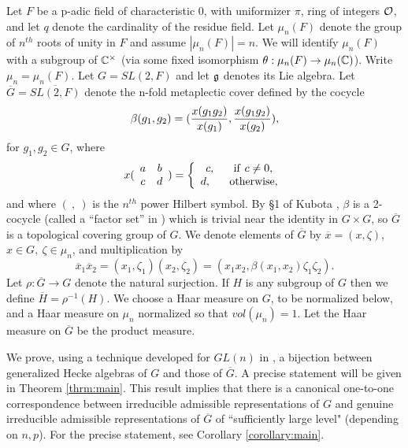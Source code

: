 
Let $F$ be a p-adic field of characteristic 0, 
with uniformizer $\pi$, ring of integers ${\cal O}$, and let 
$q$ denote the cardinality of the residue field.
Let $\mu_n(F)$ denote the group of $n^{th}$ roots of unity
in $F$ and assume $|\mu_n(F)|=n$. We 
will identify $\mu_n(F)$ with a subgroup 
of ${\Bbb{C}}^\times$
(via some fixed isomorphism 
$\theta:\mu_n(F)\rightarrow \mu_n({\Bbb{C}})$).
Write $\mu_n=\mu_n(F)$.
Let $G=SL(2,F)$ and let $\frak{g}$ denotes its Lie algebra.
Let $\overline{G}=\overline{SL(2,F)}$ denote the n-fold metaplectic
cover defined by the cocycle
\[
\beta(g_1,g_2)=({x(g_1g_2)\over x(g_1)},{x(g_1g_2)\over x(g_2)}),
\]
for $g_1,g_2\in G$, where
\[
x(
\begin{array}{cc}
a & b\\
c & d
\end{array}
)=
\left\{
\begin{array}{c}
c,\ \ \ \ \ {\rm if}\ c\not= 0,\\
d,\ \ \ \ \ {\rm otherwise},
\end{array}
\right.
\]
and where $(\ ,\ )$ is the $n^{th}$ power Hilbert symbol. 
By \S 1 of Kubota \cite{K}, $\beta$ is a 2-cocycle 
(called a ``factor set'' in \cite{K}) which is trivial
near the identity in $G\times G$, so $\overline{G}$ is a 
topological covering group of $G$. We denote
elements of $\overline{G}$ by $\overline{x}=(x,\zeta)$,
$x\in G,\ \zeta\in \mu_n$, and multiplication by
\[
\overline{x}_1\overline{x}_2=(x_1,\zeta_1)(x_2,\zeta_2)
=(x_1x_2,\beta(x_1,x_2)\zeta_1\zeta_2).
\]
Let $\rho:\overline{G}\rightarrow G$ denote
the natural surjection. If $H$ is any subgroup
of $G$ then we define $\overline{H}=\rho^{-1}(H)$.
We choose a Haar measure on $G$, to be normalized
below, and a Haar measure on $\mu_n$ normalized so that 
$vol(\mu_n)=1$. Let the Haar measure on $\overline{G}$ be
the product measure.

We prove, using a technique developed for $GL(n)$ in \cite{H}, 
a bijection between generalized Hecke
algebras of $G$ and those of $\overline{G}$. 
A precise statement will be
given in Theorem \ref{thrm:main}. This result implies that
there is a canonical one-to-one correspondence
between irreducible admissible representations of $G$ and 
genuine irreducible admissible representations of $\overline{G}$
of ``sufficiently large level" (depending on $n,p$).
For the precise statement, see Corollary
\ref{corollary:main}. 

